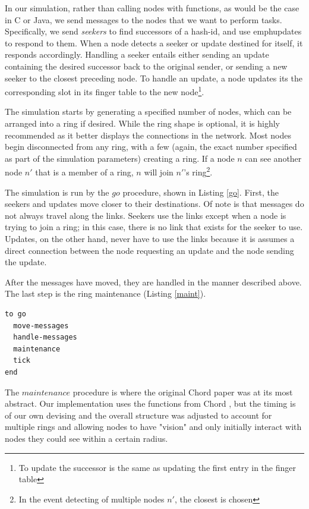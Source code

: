 \documentclass[12pt]{article} %
\begin{document}
In our simulation, rather than calling nodes with functions, as would be the case in C or Java, we send messages to the nodes that we want to perform tasks. Specifically, we send \emph{seekers} to find successors of a hash-id, and use emph{updates} to respond to them.  When a node detects a seeker or update destined for itself, it responds accordingly.  Handling a seeker entails either sending an update containing the desired successor back to the original sender, or sending a new seeker to the closest preceding node.  To handle an update, a node updates its the corresponding slot in its finger table to the new node\footnote{To update the successor is the same as updating the first entry in the finger table}.


The simulation starts by generating a specified number of nodes, which can be arranged into a ring if desired.  While the ring shape is optional, it is highly recommended as it better displays the connections in the network.  Most nodes begin disconnected from any ring, with a few (again, the exact number specified as part of the simulation parameters) creating a ring.  If a node $n$ can see another node $n'$ that is a member of a ring, $n$ will join  $n'$'s ring\footnote{In the event detecting of multiple nodes $n'$, the closest is chosen}. 

The simulation is run by the $go$ procedure, shown in Listing \ref{go}.  First, the seekers and updates move closer to their destinations.
 Of note is that messages do not always travel along the links.  Seekers use the links except when a node is trying to join a ring;  in this case, there is no link that exists for the seeker to use. Updates, on the other hand, never have to use the links because it is assumes a direct connection between the node requesting an update and the node sending the update.

After the messages have moved, they are handled in the manner described above. The last step is the ring maintenance (Listing \ref{maint}).

\begin{lstlisting}[caption={The topmost procedure of the simulation.},label=go]
to go
  move-messages
  handle-messages
  maintenance
  tick
end
\end{lstlisting}


The $maintenance$ procedure is where the original Chord paper was at its most abstract.  Our implementation uses the functions from Chord \cite{Chord}, but the timing is of our own devising and the overall structure was adjusted to account for multiple rings and allowing nodes to have "vision"  and only initially interact with nodes they could see within a certain radius.
\end{document}
